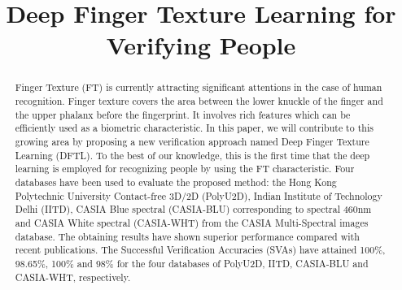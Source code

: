 \documentclass[conference]{IEEEtran}
\begin{document}
\title{Deep Finger Texture Learning for Verifying People\\
}

\author{
\and
{}
\and
{}
}

\maketitle

\begin{abstract}
Finger Texture (FT) is currently attracting significant attentions in the case of human recognition. Finger texture covers the area between the lower knuckle of the finger and the upper phalanx before the fingerprint. It involves rich features  which can be efficiently used as a biometric characteristic. In this paper, we will contribute to this growing area by proposing a new verification approach named Deep Finger Texture Learning (DFTL). To the best of our knowledge, this is the first time that the deep learning is employed for recognizing people by using the FT characteristic. Four databases have been used to evaluate the proposed method: the Hong Kong Polytechnic University Contact-free 3D/2D (PolyU2D), Indian Institute of Technology Delhi (IITD), CASIA Blue spectral (CASIA-BLU) corresponding to spectral 460nm and CASIA White spectral (CASIA-WHT) from the CASIA Multi-Spectral images database. The obtaining results have shown superior performance compared with recent publications. The Successful Verification Accuracies (SVAs) have attained 100\%, 98.65\%, 100\% and 98\% for the four databases of PolyU2D, IITD, CASIA-BLU and CASIA-WHT, respectively. 
\end{abstract}
\end{document}
